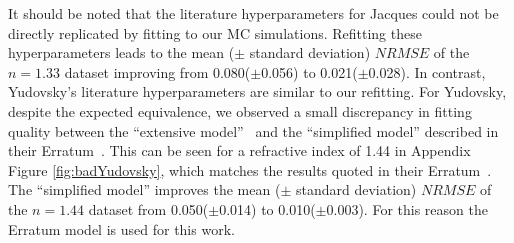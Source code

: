 It should be noted that the literature hyperparameters for Jacques could not be
directly
replicated by fitting to our MC simulations. 
Refitting these hyperparameters leads to the mean ($\pm$ standard deviation) $NRMSE$ of the $n=1.33$ dataset improving from 0.080($\pm$0.056) to 0.021($\pm$0.028). 
In contrast, Yudovsky's literature hyperparameters are similar to our refitting.
For Yudovsky, despite the expected equivalence, we observed a small discrepancy in fitting quality between the ``extensive model''~\citep{Yudovsky2009} and the ``simplified model'' described in their Erratum~\citep{Yudovsky2015}.
This can be seen for a refractive index of 1.44 in Appendix Figure \ref{fig:badYudovsky}, which matches the results quoted in their Erratum~\citep{Yudovsky2015}.
The ``simplified model'' improves the mean ($\pm$ standard deviation) $NRMSE$ of the $n=1.44$ dataset from 0.050($\pm$0.014) to 0.010($\pm$0.003).
For this reason the Erratum model is used for this work. 

